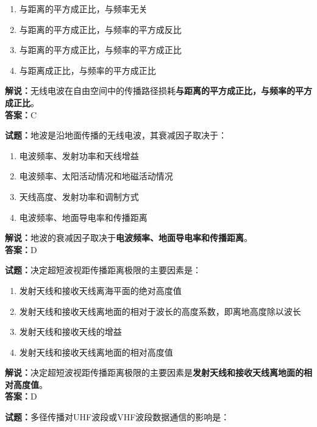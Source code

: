 \documentclass{ctexbook}
\begin{document}
\begin{enumerate}[leftmargin=3em]
	\item 与距离的平方成正比，与频率无关
	\item 与距离的平方成正比，与频率的平方成反比
	\item 与距离的平方成正比，与频率的平方成正比
	\item 与距离成正比，与频率的平方成正比
\end{enumerate}

\noindent\textbf{解说：}无线电波在自由空间中的传播路径损耗\textbf{与距离的平方成正比，与频率的平方成正比}。\\\noindent\textbf{答案：}C


\bigskip


\noindent\textbf{试题：}地波是沿地面传播的无线电波，其衰减因子取决于：

\begin{enumerate}[leftmargin=3em]
	\item 电波频率、发射功率和天线增益
	\item 电波频率、太阳活动情况和地磁活动情况
	\item 天线高度、发射功率和调制方式
	\item 电波频率、地面导电率和传播距离
\end{enumerate}

\noindent\textbf{解说：}地波的衰减因子取决于\textbf{电波频率、地面导电率和传播距离}。\\\noindent\textbf{答案：}D

\bigskip


\noindent\textbf{试题：}决定超短波视距传播距离极限的主要因素是：

\begin{enumerate}[leftmargin=3em]
	\item 发射天线和接收天线离海平面的绝对高度值
	\item 发射天线和接收天线离地面的相对于波长的高度系数，即离地高度除以波长
	\item 发射天线和接收天线的增益
	\item 发射天线和接收天线离地面的相对高度值
\end{enumerate}

\noindent\textbf{解说：}决定超短波视距传播距离极限的主要因素是\textbf{发射天线和接收天线离地面的相对高度值}。\\\noindent\textbf{答案：}D


\bigskip


\noindent\textbf{试题：}多径传播对UHF波段或VHF波段数据通信的影响是：
\end{document}
